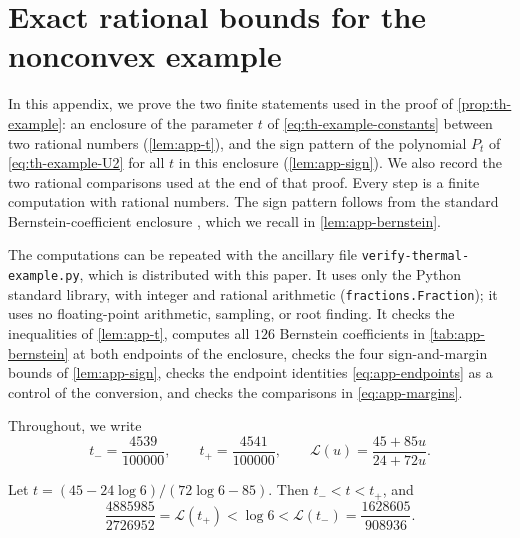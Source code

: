 \chapter{Exact rational bounds for the nonconvex example}\label{app:certificate}

In this appendix, we prove the two finite statements used in the proof of \cref{prop:th-example}: an enclosure of the parameter $t$ of \eqref{eq:th-example-constants} between two rational numbers (\cref{lem:app-t}), and the sign pattern of the polynomial $P_t$ of \eqref{eq:th-example-U2} for all $t$ in this enclosure (\cref{lem:app-sign}). We also record the two rational comparisons used at the end of that proof. Every step is a finite computation with rational numbers. The sign pattern follows from the standard Bernstein-coefficient enclosure \cite{Farouki2012,Lorentz1986}, which we recall in \cref{lem:app-bernstein}.

The computations can be repeated with the ancillary file \texttt{verify-thermal-example.py}, which is distributed with this paper. It uses only the Python standard library, with integer and rational arithmetic (\texttt{fractions.Fraction}); it uses no floating-point arithmetic, sampling, or root finding. It checks the inequalities of \cref{lem:app-t}, computes all $126$ Bernstein coefficients in \cref{tab:app-bernstein} at both endpoints of the enclosure, checks the four sign-and-margin bounds of \cref{lem:app-sign}, checks the endpoint identities \eqref{eq:app-endpoints} as a control of the conversion, and checks the comparisons in \eqref{eq:app-margins}.

Throughout, we write
\[
t_-=\frac{4539}{100000},\qquad t_+=\frac{4541}{100000},\qquad\mathcal L(u)=\frac{45+85u}{24+72u}.
\]

\begin{lemma}\label{lem:app-t}
Let $t=(45-24\log6)/(72\log6-85)$. Then $t_-<t<t_+$, and
\begin{equation}\label{eq:app-log6}
\frac{4885985}{2726952}=\mathcal L(t_+)<\log6<\mathcal L(t_-)=\frac{1628605}{908936}.
\end{equation}
\end{lemma}


